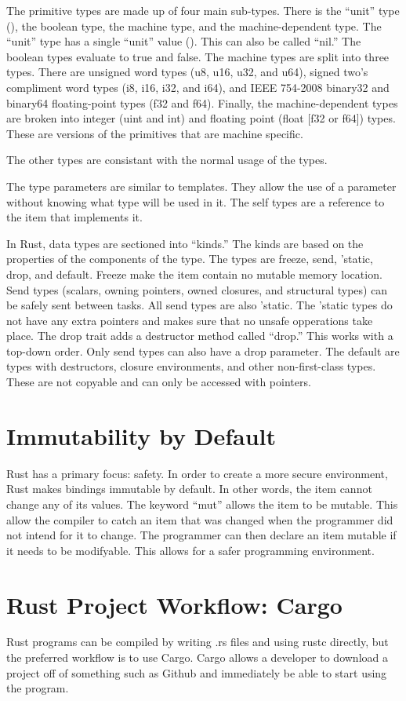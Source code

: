 \documentclass{article}
\begin{document}
The primitive types are made up of four main sub-types. There is the “unit” type (), the boolean type, the machine type, and the machine-dependent type. The “unit” type has a single “unit” value (). This can also be called “nil.” The boolean types evaluate to true and false. The machine types are split into three types. There are unsigned word types (u8, u16, u32, and u64), signed two's compliment word types (i8, i16, i32, and i64), and IEEE 754-2008 binary32 and binary64 floating-point types (f32 and f64). Finally, the machine-dependent types are broken into integer (uint and int) and floating point (float [f32 or f64]) types. These are versions of the primitives that are machine specific. 

The other types are consistant with the normal usage of the types.

The type parameters are similar to templates. They allow the use of a parameter without knowing what type will be used in it. The self types are a reference to the item that implements it. 

In Rust, data types are sectioned into “kinds.” The kinds are based on the properties of the components of the type. The types are freeze, send, 'static, drop, and default. Freeze make the item contain no mutable memory location. Send types (scalars, owning pointers, owned closures, and structural types) can be safely sent between tasks. All send types are also 'static. The 'static types do not have any extra pointers and makes sure that no unsafe opperations take place. 
The drop trait adds a destructor method called “drop.” This works with a top-down order. Only send types can also have a drop parameter. The default are types with destructors, closure environments, and other non-first-class types. These are not copyable and can only be accessed with pointers.

\section{Immutability by Default}
Rust has a primary focus: safety. In order to create a more secure environment, Rust makes bindings immutable by default. In other words, the item cannot change any of its values. The keyword “mut” allows the item to be mutable. This allow the compiler to catch an item that was changed when the programmer did not intend for it to change. The programmer can then declare an item mutable if it needs to be modifyable. This allows for a safer programming environment.

\section{Rust Project Workflow: Cargo}
Rust programs can be compiled by writing .rs files and using rustc directly, but the preferred workflow is to use Cargo. Cargo allows a developer to download a project off of something such as Github and immediately be able to start using the program.
\end{document}
